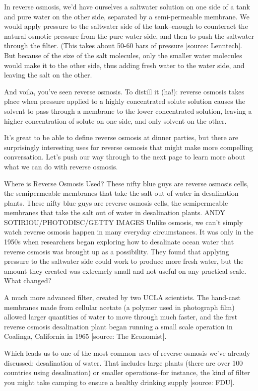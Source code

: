 In reverse osmosis, we'd have ourselves a saltwater solution on one side of a tank and pure water on the other side, separated by a semi-permeable membrane. We would apply pressure to the saltwater side of the tank--enough to counteract the natural osmotic pressure from the pure water side, and then to push the saltwater through the filter. (This takes about 50-60 bars of pressure [source: Lenntech]. But because of the size of the salt molecules, only the smaller water molecules would make it to the other side, thus adding fresh water to the water side, and leaving the salt on the other.

And voila, you've seen reverse osmosis. To distill it (ha!): reverse osmosis takes place when pressure applied to a highly concentrated solute solution causes the solvent to pass through a membrane to the lower concentrated solution, leaving a higher concentration of solute on one side, and only solvent on the other.

It's great to be able to define reverse osmosis at dinner parties, but there are surprisingly interesting uses for reverse osmosis that might make more compelling conversation. Let's push our way through to the next page to learn more about what we can do with reverse osmosis.

Where is Reverse Osmosis Used?
These nifty blue guys are reverse osmosis cells, the semipermeable membranes that take the salt out of water in desalination plants.
These nifty blue guys are reverse osmosis cells, the semipermeable membranes that take the salt out of water in desalination plants.
ANDY SOTIRIOU/PHOTODISC/GETTY IMAGES
Unlike osmosis, we can't simply watch reverse osmosis happen in many everyday circumstances. It was only in the 1950s when researchers began exploring how to desalinate ocean water that reverse osmosis was brought up as a possibility. They found that applying pressure to the saltwater side could work to produce more fresh water, but the amount they created was extremely small and not useful on any practical scale. What changed?

A much more advanced filter, created by two UCLA scientists. The hand-cast membranes made from cellular acetate (a polymer used in photograph film) allowed larger quantities of water to move through much faster, and the first reverse osmosis desalination plant began running a small scale operation in Coalinga, California in 1965 [source: The Economist].

Which leads us to one of the most common uses of reverse osmosis we've already discussed: desalination of water. That includes large plants (there are over 100 countries using desalination) or smaller operations--for instance, the kind of filter you might take camping to ensure a healthy drinking supply [source: FDU].

